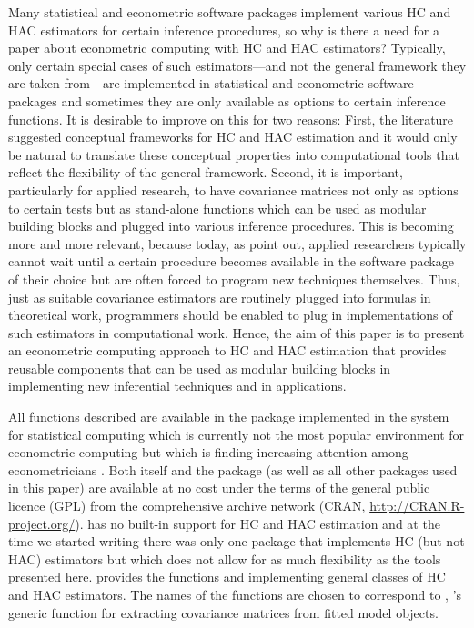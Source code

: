 \documentclass{Z}
\begin{document}
Many statistical and econometric software packages implement various HC and HAC
estimators for certain inference procedures, so why is there a need for a paper about 
econometric computing with HC and HAC estimators? Typically, only certain special cases
of such estimators---and not the general framework they are taken from---are implemented
in statistical and econometric software packages and sometimes they are only available
as options to certain inference functions. It is desirable to improve on this for two
reasons: First, the literature suggested conceptual frameworks for HC and HAC estimation
and it would only be natural to translate these conceptual properties into computational
tools that reflect the flexibility of the general framework. Second, it is important,
particularly for applied research, to have covariance matrices not only as options to
certain tests but as stand-alone functions which can be used as modular building blocks
and plugged into various inference procedures. This is becoming more and more relevant,
because today, as \cite{hac:Cribari-Neto+Zarkos:2003} point out, applied researchers 
typically cannot wait until a certain procedure becomes available in the software
package of their choice but are often forced to program new techniques themselves. Thus,
just as suitable covariance estimators are routinely plugged into formulas in theoretical
work, programmers should be enabled to plug in implementations of such estimators 
in computational work.
Hence, the aim of this paper is to present an econometric computing approach to HC and HAC
estimation that provides reusable components that can be used as modular building blocks
in implementing new inferential techniques and in applications.

All functions described are available in the package  implemented in the
 system for statistical  computing \citep{hac:R:2004} which is currently
not the most popular environment for econometric computing but which is finding increasing
attention among econometricians \citep{hac:Cribari-Neto+Zarkos:1999,hac:Racine+Hyndman:2002}.
Both  itself and the  package (as well as all other packages 
used in this paper) are available at no cost under the terms of the general public licence
(GPL) from the comprehensive  archive network (CRAN, \url{http://CRAN.R-project.org/}).
 has no built-in support for HC and HAC estimation and at the time we
started writing  there was only one package that implements HC (but not HAC)
estimators \citep[the  package][]{hac:Fox:2002} but which does not allow for as much 
flexibility as the tools presented here.  provides the functions  and 
implementing general classes of HC and HAC estimators. The names of the functions are chosen to correspond to 
, 's generic function for extracting covariance matrices from fitted model objects.
\end{document}
